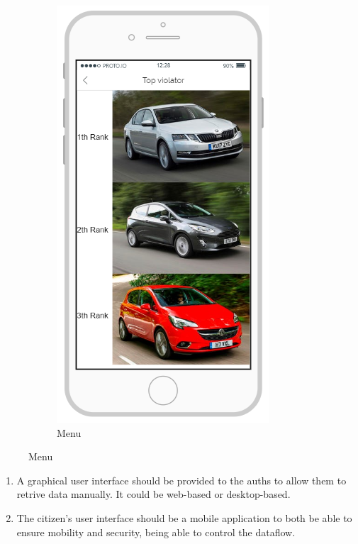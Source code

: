 \documentclass{article}
\newcommand{\enum}[1]{\texttt{#1.\arabic*}}
\begin{document}
\begin{figure}[H]
\begin{subfigure}[H]{0.25\linewidth}
					\includegraphics[width=\linewidth]{Images/Top_Violators.png}
					\caption{Menu}
				\end{subfigure}
			\end{figure}				
			\newpage	
		
			\begin{enumerate}[label=\enum{UI}]
				\item A graphical user interface should be provided to the auths to allow them to retrive data manually. It could be web-based or desktop-based.
				\item \label{UI_mobileApp}The citizen's user interface should be a mobile application to both be able to ensure mobility and security, being able to control the dataflow.
			\end{enumerate}
			
\end{document}
